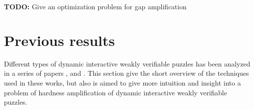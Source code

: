 \documentclass[11pt,a4paper,titlepage]{memoir}
\begin{document}
\begin{todo}
  \textbf{TODO:} Give an optimization problem for gap amplification
\end{todo}


\section{Previous results}
Different types of dynamic interactive weakly verifiable puzzles has been analyzed in a series of papers \cite{canetti2004hardness},
\cite{Dodis:2009:SAI:1530441.1530450} and \cite{DBLP:journals/corr/abs-1002-3534}.
This section give the short overview of the techniques used in these works, but also is aimed to give more intuition and insight into
a problem of hardness amplification of dynamic interactive weakly verifiable puzzles.
\label{st:previous_results}
\end{document}

